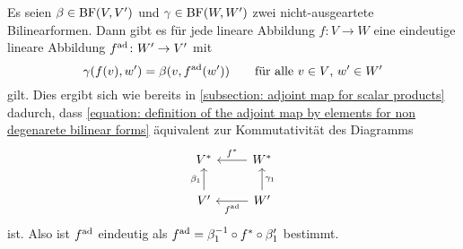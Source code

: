 Es seien $\beta \in \operatorname{BF}(V,V')$ und $\gamma \in \operatorname{BF}(W,W')$ zwei nicht-ausgeartete Bilinearformen.
Dann gibt es für jede lineare Abbildung $f \colon V \to W$ eine eindeutige lineare Abbildung $f^{\operatorname{ad}} \colon W' \to V'$ mit
\begin{equation}
  \label{equation: definition of the adjoint map by elements for non degenarete bilinear forms}
    \gamma(f(v), w')
  = \beta(v, f^{\operatorname{ad}}(w'))
  \qquad
  \text{für alle $v \in V$, $w' \in W'$}
\end{equation}
gilt.
Dies ergibt sich wie bereits in \ref{subsection: adjoint map for scalar products} dadurch, dass \eqref{equation: definition of the adjoint map by elements for non degenarete bilinear forms} äquivalent zur Kommutativität des Diagramms
\[
  \begin{tikzcd}
      \dual{V}
    & \dual{W}
      \arrow[swap]{l}{\dual{f}}
    \\
      V'
      \arrow{u}{\beta_1}
    & W'
      \arrow[swap]{u}{\gamma_1}
      \arrow{l}{\adj{f}}
  \end{tikzcd}
\]
ist.
Also ist $f^{\operatorname{ad}}$ eindeutig als $f^{\operatorname{ad}} = \beta_1^{-1} \circ f^* \circ \beta'_1$ bestimmt.













